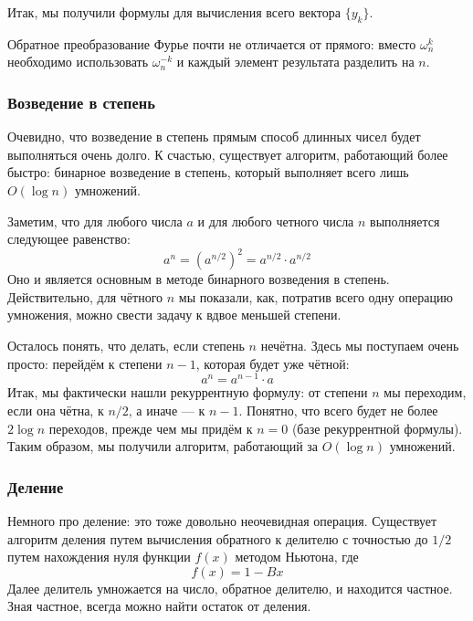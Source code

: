 \documentclass[12pt]{article}
\begin{document}
	Итак, мы получили формулы для вычисления всего вектора $\{y_k\}$.
	
	Обратное преобразование Фурье почти не отличается от прямого: вместо $\omega_n^k$ необходимо использовать $\omega_n^{-k}$ и каждый элемент результата разделить на $n$.
	
	\subsubsection*{Возведение в степень}
	Очевидно, что возведение в степень прямым способ длинных чисел будет выполняться очень долго. К счастью, существует алгоритм, работающий более быстро: бинарное возведение в степень, который выполняет всего лишь $O(\log n)$ умножений.
	
	Заметим, что для любого числа $a$ и для любого четного числа $n$ выполняется следующее равенство:
	\begin{equation*}
		a^n = (a^{n/2})^2 = a^{n/2} \cdot a^{n/2}
	\end{equation*}
Оно и является основным в методе бинарного возведения в степень. Действительно, для чётного $n$ мы показали, как, потратив всего одну операцию умножения, можно свести задачу к вдвое меньшей степени.

Осталось понять, что делать, если степень $n$ нечётна. Здесь мы поступаем очень просто: перейдём к степени $n-1$, которая будет уже чётной:
\begin{equation*}
	a^n = a^{n-1} \cdot a
\end{equation*}
Итак, мы фактически нашли рекуррентную формулу: от степени $n$ мы переходим, если она чётна, к $n/2$, а иначе — к $n-1$. Понятно, что всего будет не более $2 \log n$ переходов, прежде чем мы придём к $n = 0$ (базе рекуррентной формулы). Таким образом, мы получили алгоритм, работающий за $O (\log n)$ умножений.

\subsubsection*{Деление}
Немного про деление: это тоже довольно неочевидная операция. Существует алгоритм деления путем вычисления обратного к делителю с точностью до $1/2$ путем нахождения нуля функции $f(x)$ методом Ньютона, где
\begin{equation*}
	f(x) = 1 - Bx
\end{equation*}
Далее делитель умножается на число, обратное делителю, и находится частное. Зная частное, всегда можно найти остаток от деления.
\end{document}
